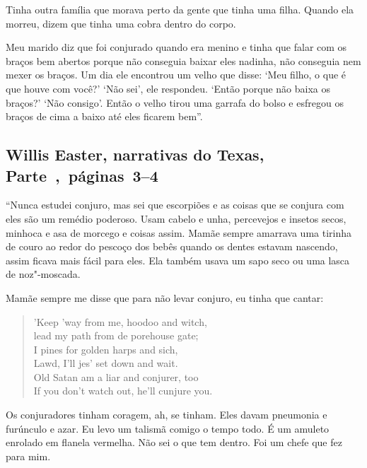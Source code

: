 Tinha outra família que morava perto da gente que tinha uma filha.
Quando ela morreu, dizem que tinha uma cobra dentro do corpo.

Meu marido diz que foi conjurado quando era menino e tinha que falar com
os braços bem abertos porque não conseguia baixar eles nadinha, não
conseguia nem mexer os braços. Um dia ele encontrou um velho que disse:
`Meu filho, o que é que houve com você?' `Não sei', ele respondeu.
`Então porque não baixa os braços?' `Não consigo'. Então o velho tirou
uma garrafa do bolso e esfregou os braços de cima a baixo até eles
ficarem bem''.

\subsection{Willis Easter, narrativas do Texas, Parte~,~páginas~3--4} \label{ref79}

``Nunca estudei conjuro, mas sei que escorpiões e as coisas que se
conjura com eles são um remédio poderoso. Usam cabelo e unha, percevejos
e insetos secos, minhoca e asa de morcego e coisas assim. Mamãe sempre
amarrava uma tirinha de couro ao redor do pescoço dos bebês quando os
dentes estavam nascendo, assim ficava mais fácil para eles. Ela também
usava um sapo seco ou uma lasca de noz"-moscada.

Mamãe sempre me disse que para não levar conjuro, eu tinha que cantar:

\begin{verse}
'Keep 'way from me, hoodoo and witch,\\
lead my path from de porehouse gate;\\
I pines for golden harps and sich,\\ 
Lawd, I'll jes' set down and wait.\\
Old Satan am a liar and conjurer, too\\
If you don't watch out, he'll cunjure you.\footnotemark
\end{verse}


Os conjuradores tinham coragem, ah, se tinham. Eles davam pneumonia e
furúnculo e azar. Eu levo um talismã comigo o tempo todo. É um amuleto
enrolado em flanela vermelha. Não sei o que tem dentro. Foi um chefe que
fez para mim.

